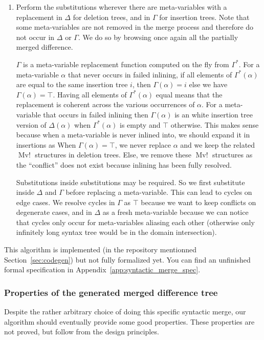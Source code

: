 \documentclass[a4paper,11pt]{article}
\DeclareMathOperator\MvConflict{Mv!}
\begin{document}
\begin{enumerate}
 \item Perform the substitutions wherever there are meta-variables with a replacement in $\Delta$ for deletion trees, and in $\Gamma$ for insertion trees. Note that some meta-variables are not removed in the merge process and therefore do not occur in $\Delta$ or $\Gamma$. We do so by browsing once again all the partially merged difference.
 
 $\Gamma$ is a meta-variable replacement function computed on the fly from $\Gamma^*$. For a meta-variable $\alpha$ that never occurs in failed inlining, if all elements of $\Gamma^*(\alpha)$ are equal to the same insertion tree $i$, then $\Gamma(\alpha) = i$ else we have $\Gamma(\alpha) = \top$. Having all elements of $\Gamma^*(\alpha)$ equal means that the replacement is coherent across the various occurrences of $\alpha$. For a meta-variable that occurs in failed inlining then $\Gamma(\alpha)$ is an white insertion tree version of $\Delta(\alpha)$ when $\Gamma^*(\alpha)$ is empty and $\top$ otherwise. This makes sense because when a meta-variable is never inlined into, we should expand it in insertions as 
 When $\Gamma(\alpha) = \top$, we never replace $\alpha$ and we keep the related $\MvConflict$ structures in deletion trees. Else, we remove these $\MvConflict$ structures as the ``conflict'' does not exist because inlining has been fully resolved.
 
 Substitutions inside substitutions may be required. So we first substitute inside $\Delta$ and $\Gamma$ before replacing a meta-variable. This can lead to cycles on edge cases. We resolve cycles in $\Gamma$ as $\top$ because we want to keep conflicts on degenerate cases, and in $\Delta$ as a fresh meta-variable because we can notice that cycles only occur for meta-variables aliasing each other (otherwise only infinitely long syntax tree would be in the domain intersection).
\end{enumerate}

This algorithm is implemented (in the repository mentionned Section~\ref{sec:codegen}) but not fully formalized yet. You can find an unfinished formal specification in Appendix~\ref{app:syntactic_merge_spec}.

\subsubsection{Properties of the generated merged difference tree}
\label{sec:merge_properties}
Despite the rather arbitrary choice of doing this specific syntactic
merge, our algorithm should eventually provide some good
properties. These properties are not proved, but follow from the design principles.
\end{document}
